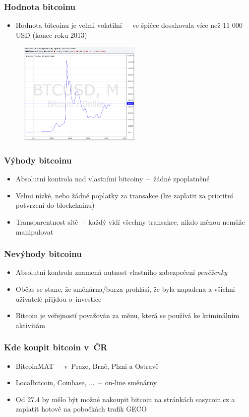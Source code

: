 \documentclass{beamer}
\begin{document}
\begin{frame}
\frametitle{Hodnota bitcoinu}
\begin{itemize}
\item Hodnota bitcoinu je velmi volatilní \,--\, ve špičce dosahovala více než 11 000 USD (konec roku 2013)
\end{itemize}
\begin{figure}[h]
\includegraphics[height=5cm]{kurz}
\centering
\end{figure}
\end{frame}

\begin{frame}
\frametitle{Výhody bitcoinu}
\begin{itemize}
\item Absolutní kontrola nad vlastními bitcoiny \,--\, žádné zpoplatněné 
\item Velmi nízké, nebo žádné poplatky za transakce (lze zaplatit za prioritní potvrzení do blockchainu)
\item Transparentnost sítě \,--\, každý vidí všechny transakce, nikdo měnou nemůže manipulovat
\end{itemize}
\end{frame}

\begin{frame}
\frametitle{Nevýhody bitcoinu}
\begin{itemize}
\item Absolutní kontrola znamená nutnost vlastního zabezpečení \emph{peněženky}
\item Občas se stane, že směnárna/burza prohlásí, že byla napadena a všichni uživatelé přijdou o~investice
\item Bitcoin je veřejností považován za měnu, která se používá ke kriminálním aktivitám
\end{itemize}
\end{frame}

\begin{frame}
\frametitle{Kde koupit bitcoin v~ČR}
\begin{itemize}
\item BitcoinMAT \,--\, v~Praze, Brně, Plzni a Ostravě
\item Localbitcoin, Coinbase, ... \,--\, on-line směnárny
\item Od 27.4 by mělo být možné nakoupit bitcoin na stránkách easycoin.cz a zaplatit hotově na pobočkách trafik GECO
\end{itemize}
\end{frame}
\end{document}
